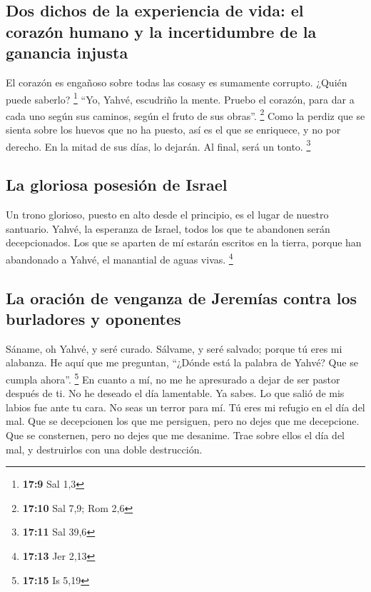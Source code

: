 \begin{paracol}{2}
\hypertarget{dos-dichos-de-la-experiencia-de-vida-el-corazuxf3n-humano-y-la-incertidumbre-de-la-ganancia-injusta}{%
\subsection{Dos dichos de la experiencia de vida: el corazón humano y la
incertidumbre de la ganancia
injusta}\label{dos-dichos-de-la-experiencia-de-vida-el-corazuxf3n-humano-y-la-incertidumbre-de-la-ganancia-injusta}}

 El corazón es engañoso sobre todas las cosasy es
sumamente corrupto. ¿Quién puede saberlo? \footnote{\textbf{17:9} Sal
  1,3}  ``Yo, Yahvé, escudriño la mente. Pruebo el
corazón, para dar a cada uno según sus caminos, según el fruto de sus
obras''. \footnote{\textbf{17:10} Sal 7,9; Rom 2,6}  Como
la perdiz que se sienta sobre los huevos que no ha puesto, así es el que
se enriquece, y no por derecho. En la mitad de sus días, lo dejarán. Al
final, será un tonto. \footnote{\textbf{17:11} Sal 39,6}

\hypertarget{la-gloriosa-posesiuxf3n-de-israel}{%
\subsection{La gloriosa posesión de
Israel}\label{la-gloriosa-posesiuxf3n-de-israel}}

 Un trono glorioso, puesto en alto desde el principio, es
el lugar de nuestro santuario.  Yahvé, la esperanza de
Israel, todos los que te abandonen serán decepcionados. Los que se
aparten de mí estarán escritos en la tierra, porque han abandonado a
Yahvé, el manantial de aguas vivas. \footnote{\textbf{17:13} Jer 2,13}

\hypertarget{la-oraciuxf3n-de-venganza-de-jeremuxedas-contra-los-burladores-y-oponentes}{%
\subsection{La oración de venganza de Jeremías contra los burladores y
oponentes}\label{la-oraciuxf3n-de-venganza-de-jeremuxedas-contra-los-burladores-y-oponentes}}

 Sáname, oh Yahvé, y seré curado. Sálvame, y seré
salvado; porque tú eres mi alabanza.  He aquí que me
preguntan, ``¿Dónde está la palabra de Yahvé? Que se cumpla ahora''.
\footnote{\textbf{17:15} Is 5,19}  En cuanto a mí, no me
he apresurado a dejar de ser pastor después de ti. No he deseado el día
lamentable. Ya sabes. Lo que salió de mis labios fue ante tu cara.
 No seas un terror para mí. Tú eres mi refugio en el día
del mal.  Que se decepcionen los que me persiguen, pero
no dejes que me decepcione. Que se consternen, pero no dejes que me
desanime. Trae sobre ellos el día del mal, y destruirlos con una doble
destrucción.


\end{paracol}

